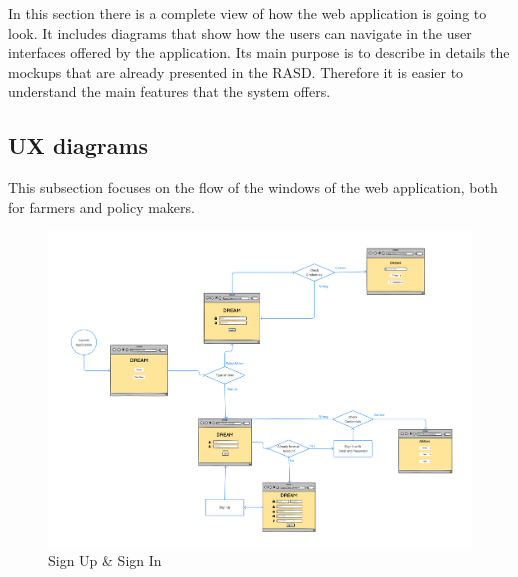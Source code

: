 In this section there is a complete view of how the web application is going to look. 
It includes diagrams that show how the users can navigate in the user interfaces offered by the application.
Its main purpose is to describe in details the mockups that are already presented in the RASD. Therefore it is easier to understand 
the main features that the system offers.


\subsection{UX diagrams}
This subsection focuses on the flow of the windows of the web application, 
both for farmers and policy makers.

\begin{figure}[H]
    \begin{center}
          \includegraphics[width=1\textwidth]{images/UXdiagram_login.png}
          \caption{Sign Up \& Sign In}
    \end{center}
\end{figure}

